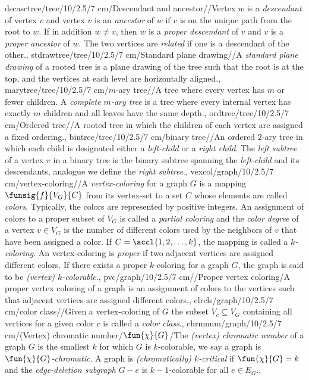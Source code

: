 dscasctree/tree/10/2.5/7 cm/{Descendant and ancestor}/{}/{Vertex $w$ is a \emph{descendant} of vertex $v$ and vertex $v$ is an \emph{ancestor} of $w$ if $v$ is on the unique path from the root to $w$. If in addition $w\neq v$, then $w$ is a \emph{proper descendant} of $v$ and $v$ is a \emph{proper ancestor} of $w$. The two vertices are \emph{related} if one is a descendant of the other.},
stdrawtree/tree/10/2.5/7 cm/{Standard plane drawing}/{}/{A \emph{standard plane drawing} of a rooted tree is a plane drawing of the tree such that the root is at the top, and the vertices at each level are horizontally aligned.},
marytree/tree/10/2.5/7 cm/{$m$-ary tree}/{}/{A tree where every vertex has $m$ or fewer children. A \emph{complete $m$-ary tree} is a tree where every internal vertex has exactly $m$ children and all leaves have the same depth.},
ordtree/tree/10/2.5/7 cm/{Ordered tree}/{}/{A rooted tree in which the children of each vertex are assigned a fixed ordering.},
bintree/tree/10/2.5/7 cm/{binary tree}/{}/{An ordered $2$-ary tree in which each child is designated either a \emph{left-child} or a \emph{right child}. The \emph{left subtree} of a vertex $v$ in a binary tree is the binary subtree spanning the \emph{left-child} and its descendants, analogue we define the \emph{right subtree}.},
vexcol/graph/10/2.5/7 cm/{vertex-coloring}/{}/{A \emph{vertex-coloring} for a graph $G$ is a mapping $\funsig{f}{V_G}{C}$ from its vertex-set to a set $C$ whose elements are called \emph{colors}. Typically, the colors are represented by positive integers. An assignment of colors to a proper subset of $V_G$ is called a \emph{partial coloring} and the \emph{color degree} of a vertex $v\in V_G$ is the number of different colors used by the neighbors of $v$ that have been assigned a color. If $C=\accl{1,2,\ldots,k}$, the mapping is called a \emph{$k$-coloring}. An vertex-coloring is \emph{proper} if two adjacent vertices are assigned different colors. If there exists a proper $k$-coloring for a graph $G$, the graph is said to be \emph{(vertex) $k$-colorable}.},
pvc/graph/10/2.5/7 cm/{}/{Proper vertex coloring}/{A proper vertex coloring of a graph is an assignment of colors to the vertices such that adjacent vertices are assigned different colors.},
clrcls/graph/10/2.5/7 cm/{color class}/{}/{Given a vertex-coloring of $G$ the subset $V_c\subseteq V_G$ containing all vertices for a given color $c$ is called a \emph{color class}.},
chrmnum/graph/10/2.5/7 cm/{(Vertex) chromatic number}/{$\fun{\chi}{G}$}/{The \emph{(vertex) chromatic number} of a graph $G$ is the smallest $k$ for which $G$ is $k$-colorable, we say a graph is \emph{$\fun{\chi}{G}$-chromatic}. A graph is \emph{(chromatically) $k$-critical} if $\fun{\chi}{G}=k$ and the \emph{edge-deletion subgraph} $G-e$ is $k-1$-colorable for all $e\in E_G$.},
